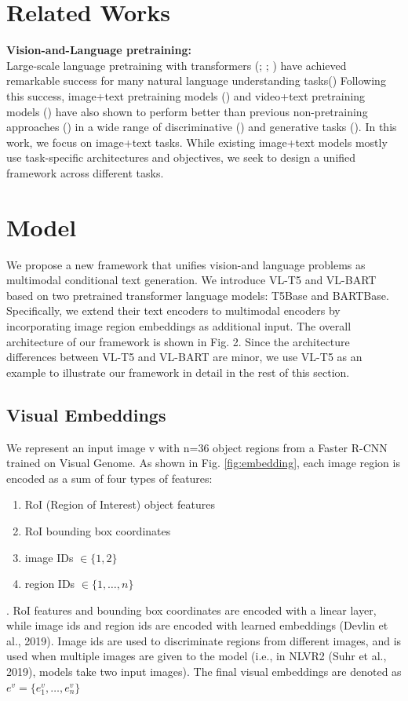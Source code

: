 \documentclass[twocolumn,3p,a4paper,preprint,11pt,margin=2.5cm]{elsarticle}
\begin{document}
\section{\Large{Related Works}}
\vspace{0.3 cm}
\textbf{Vision-and-Language pretraining:}\\
Large-scale language pretraining with transformers (\cite{vaswani};
\cite{MingWeiChang}; \cite{YinhanLiu}) have achieved
remarkable success for many natural language understanding tasks(\cite{RowanZellers})  Following this success, image+text pretraining models (\cite{ZhichengHuang})  and video+text pretraining models (\cite{ChenSun}) have also shown to perform better than previous non-pretraining approaches (\cite{Anderson}) in a wide range
of discriminative (\cite{Hudson}) and generative tasks (\cite{XinleiChen}). In this work, we focus on
image+text tasks. While existing image+text models mostly
use task-specific architectures and objectives, we seek to
design a unified framework across different tasks.\\
\section{\Large{Model}}
\vspace{0.3 cm}
We propose a new framework that unifies vision-and language problems as multimodal conditional text generation. We introduce VL-T5 and VL-BART based on two pretrained transformer language models: T5Base and BARTBase. Specifically, we extend their text encoders to multimodal encoders by incorporating image region embeddings as additional input. The overall architecture of our framework is shown in Fig. 2. Since the architecture differences between VL-T5 and VL-BART are minor, we use VL-T5 as an example to illustrate our framework in detail in the rest of this section.

\subsection{Visual Embeddings}
\vspace{0.3 cm}
We represent an input image v with n=36 object regions from a Faster R-CNN trained on Visual Genome. As shown in Fig. \ref{fig:embedding}, each image region is encoded as a sum of four types of features: 
\noindent %
\begin{enumerate}[label=(\roman*)] %
    \item RoI (Region of Interest) object features
    \item RoI bounding box coordinates
    \item image IDs $\in \{1, 2\}$
    \item region IDs $\in \{1, \dots, n\}$
\end{enumerate}.
RoI features and bounding box
coordinates are encoded with a linear layer, while image ids
and region ids are encoded with learned embeddings (Devlin et al., 2019). Image ids are used to discriminate regions
from different images, and is used when multiple images
are given to the model (i.e., in NLVR2 (Suhr et al., 2019),
models take two input images). The final visual embeddings
are denoted as $e^{v} = \{e_{1}^{v}, \dots ,e_{n}^{v}\}$
\end{document}
